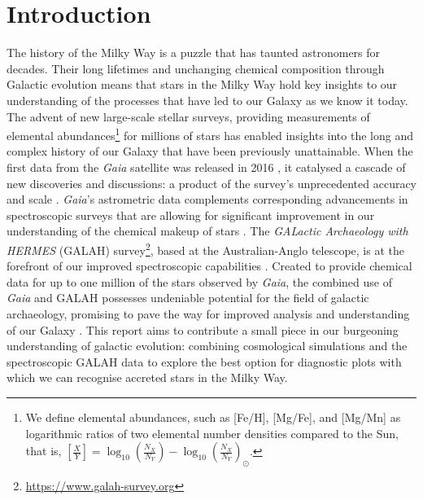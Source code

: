 \documentclass[fleqn,usenatbib]{mnras}
\newcommand{\Gaia}{\textit{Gaia}\xspace} %
\begin{document}


\section{Introduction}
\label{sec:intro}

The history of the Milky Way is a puzzle that has taunted astronomers for decades. Their long lifetimes and unchanging chemical composition through Galactic evolution means that stars in the Milky Way hold key insights to our understanding of the processes that have led to our Galaxy as we know it today. The advent of new large-scale stellar surveys, providing measurements of elemental abundances\footnote{We define elemental abundances, such as [Fe/H], [Mg/Fe], and [Mg/Mn] as logarithmic ratios of two elemental number densities compared to the Sun, that is, $\left[\frac{X}{Y}\right]=\log_{10}\left(\frac{N_X}{N_Y}\right) -\log_{10}\left(\frac{N_X}{N_Y}\right)_\odot$.} for millions of stars has enabled insights into the long and complex history of our Galaxy that have been previously unattainable. When the first data from the \Gaia satellite was released in 2016 \citep{Brown2016}, it catalysed a cascade of new discoveries and discussions: a product of the survey's unprecedented accuracy and scale \citep{BlandHawthorn2019}. \Gaia's astrometric data complements corresponding advancements in spectroscopic surveys that are allowing for significant improvement in our understanding of the chemical makeup of stars \citep{Buck2021}. The \textit{GALactic Archaeology with HERMES} (GALAH) survey\footnote{\url{https://www.galah-survey.org}}, based at the Australian-Anglo telescope, is at the forefront of our improved spectroscopic capabilities \citep{DeSilva2015}. Created to provide chemical data for up to one million of the stars observed by \Gaia, the combined use of \Gaia and GALAH possesses undeniable potential for the field of galactic archaeology, promising to pave the way for improved analysis and understanding of our Galaxy \citep{Buder2021}. This report aims to contribute a small piece in our burgeoning understanding of galactic evolution: combining cosmological simulations and the spectroscopic GALAH data to explore the best option for diagnostic plots with which we can recognise accreted stars in the Milky Way.  


\end{document}
